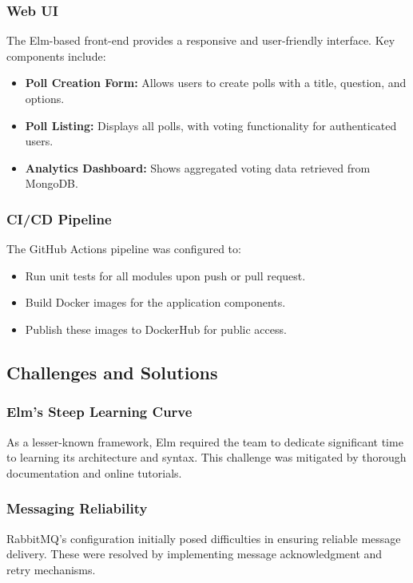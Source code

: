 \subsubsection{Web UI}
The Elm-based front-end provides a responsive and user-friendly interface. Key components include:
\begin{itemize}
    \item \textbf{Poll Creation Form:} Allows users to create polls with a title, question, and options.
    \item \textbf{Poll Listing:} Displays all polls, with voting functionality for authenticated users.
    \item \textbf{Analytics Dashboard:} Shows aggregated voting data retrieved from MongoDB.
\end{itemize}

\subsubsection{CI/CD Pipeline}
The GitHub Actions pipeline was configured to:
\begin{itemize}
    \item Run unit tests for all modules upon push or pull request.
    \item Build Docker images for the application components.
    \item Publish these images to DockerHub for public access.
\end{itemize}

\subsection{Challenges and Solutions}
\subsubsection{Elm’s Steep Learning Curve}
As a lesser-known framework, Elm required the team to dedicate significant time to learning its architecture and syntax. This challenge was mitigated by thorough documentation and online tutorials.

\subsubsection{Messaging Reliability}
RabbitMQ’s configuration initially posed difficulties in ensuring reliable message delivery. These were resolved by implementing message acknowledgment and retry mechanisms.

